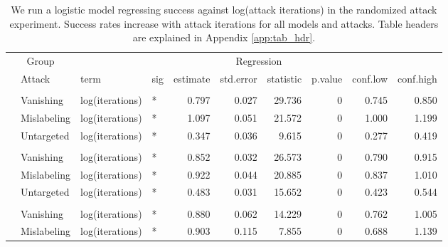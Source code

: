\documentclass[
]{article}
\begin{document}
\begingroup\fontsize{9}{11}\selectfont

\begin{longtable}[t]{llllrrrrrr}
\caption{\label{tab:num_iteration_table}We run a logistic model regressing success against log(attack iterations) in the randomized attack experiment. Success rates increase with attack iterations for all models and attacks. Table headers are explained in Appendix \ref{app:tab_hdr}.}\\
\toprule
\multicolumn{2}{c}{Group} & \multicolumn{8}{c}{Regression} \\
\cmidrule(l{3pt}r{3pt}){1-2} \cmidrule(l{3pt}r{3pt}){3-10}
 & Attack & term & sig & estimate & std.error & statistic & p.value & conf.low & conf.high\\
\midrule
\addlinespace[0.3em]
\multicolumn{10}{l}{\textbf{YOLOv3}}\\
\hspace{1em} & Vanishing & log(iterations) & * & 0.797 & 0.027 & 29.736 & 0 & 0.745 & 0.850\\
\cmidrule{2-10}\nopagebreak
\hspace{1em} & Mislabeling & log(iterations) & * & 1.097 & 0.051 & 21.572 & 0 & 1.000 & 1.199\\
\cmidrule{2-10}\nopagebreak
\hspace{1em} & Untargeted & log(iterations) & * & 0.347 & 0.036 & 9.615 & 0 & 0.277 & 0.419\\
\cmidrule{1-10}\pagebreak[0]
\addlinespace[0.3em]
\multicolumn{10}{l}{\textbf{SSD}}\\
\hspace{1em} & Vanishing & log(iterations) & * & 0.852 & 0.032 & 26.573 & 0 & 0.790 & 0.915\\
\cmidrule{2-10}\nopagebreak
\hspace{1em} & Mislabeling & log(iterations) & * & 0.922 & 0.044 & 20.885 & 0 & 0.837 & 1.010\\
\cmidrule{2-10}\nopagebreak
\hspace{1em} & Untargeted & log(iterations) & * & 0.483 & 0.031 & 15.652 & 0 & 0.423 & 0.544\\
\cmidrule{1-10}\pagebreak[0]
\addlinespace[0.3em]
\multicolumn{10}{l}{\textbf{RetinaNet}}\\
\hspace{1em} & Vanishing & log(iterations) & * & 0.880 & 0.062 & 14.229 & 0 & 0.762 & 1.005\\
\cmidrule{2-10}\nopagebreak
\hspace{1em} & Mislabeling & log(iterations) & * & 0.903 & 0.115 & 7.855 & 0 & 0.688 & 1.139\\

\end{longtable}
\end{document}
